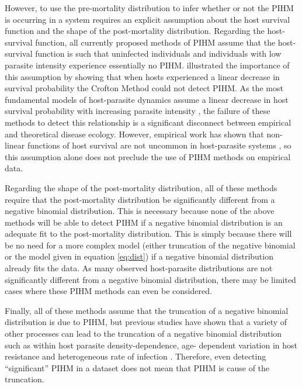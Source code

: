 \documentclass[12pt, a4paper]{article}
\begin{document}
However, to use the pre-mortality distribution to infer whether or not the PIHM
is occurring in a system requires an explicit assumption about the host
survival function and the shape of the post-mortality distribution.  Regarding
the host-survival function, all currently proposed methods of PIHM assume that
the host-survival function is such that uninfected individuals and individuals
with low parasite intensity experience essentially no PIHM. \cite{Lanciani1989}
illustrated the importance of this assumption by showing that when hosts
experienced a linear decrease in survival probability the Crofton Method could
not detect PIHM.   As the most fundamental models of host-parasite dynamics
assume a linear decrease in host survival probability with increasing parasite
intensity \citep{AndersonandMay1978}, the failure of these methods to detect
this relationship is a significant disconnect between empirical and theoretical
disease ecology.  However, empirical work has shown that non-linear functions
of host survival are not uncommon in host-parasite systems \citep{Benesh2011},
so this assumption alone does not preclude the use of PIHM methods on empirical data.

Regarding the shape of the post-mortality distribution, all of these methods
require that the post-mortality distribution be significantly different from a
negative binomial distribution.  This is necessary because none of the above
methods will be able to detect PIHM if a negative binomial distribution is an
adequate fit to the post-mortality distribution.  This is simply because there
will be no need for a more complex model (either truncation of the negative
binomial or the model given in equation \ref{eq:dist}) if a negative binomial
distribution already fits the data. As many observed host-parasite
distributions are not significantly different from a negative binomial
distribution, there may be limited cases where these PIHM methods can even be
considered.

Finally, all of these methods assume that the truncation of a negative binomial
distribution is due to PIHM, but previous studies have shown that a variety of
other processes can lead to the truncation of a negative binomial distribution
such as within host parasite density-dependence, age- dependent variation in
host resistance and heterogeneous rate of infection
\citep{McCallum2000a,Anderson1982a,Rousset1996}.  Therefore, even detecting
``significant'' PIHM in a dataset does not mean that PIHM is cause of the
truncation.
\end{document}
